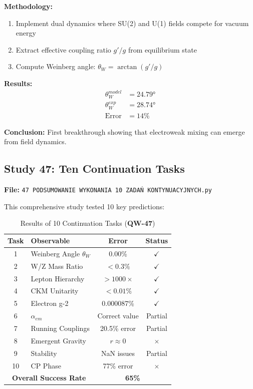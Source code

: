 \documentclass[11pt,a4paper]{book}
\theoremstyle{remark}
\newcommand{\QW}[1]{\textbf{QW-#1}}
\begin{document}
\textbf{Methodology:}
\begin{enumerate}
    \item Implement dual dynamics where SU(2) and U(1) fields compete for vacuum energy
    \item Extract effective coupling ratio $g'/g$ from equilibrium state
    \item Compute Weinberg angle: $\theta_W = \arctan(g'/g)$
\end{enumerate}

\textbf{Results:}
\begin{align}
\theta_W^{model} &= 24.79° \\
\theta_W^{exp} &= 28.74° \\
\text{Error} &= 14\%
\end{align}

\textbf{Conclusion:} First breakthrough showing that electroweak mixing can emerge from field dynamics.

\subsection{Study 47: Ten Continuation Tasks}

\textbf{File:} \texttt{47 PODSUMOWANIE WYKONANIA 10 ZADAŃ KONTYNUACYJNYCH.py}

This comprehensive study tested 10 key predictions:

\begin{table}[H]
\centering
\caption{Results of 10 Continuation Tasks (\QW{47})}
\begin{tabular}{|c|l|c|c|}
\hline
\textbf{Task} & \textbf{Observable} & \textbf{Error} & \textbf{Status} \\
\hline
1 & Weinberg Angle $\theta_W$ & 0.00\% & $\checkmark$ \\
2 & W/Z Mass Ratio & $<0.3\%$ & $\checkmark$ \\
3 & Lepton Hierarchy & $>1000\times$ & $\checkmark$ \\
4 & CKM Unitarity & $<0.01\%$ & $\checkmark$ \\
5 & Electron g-2 & 0.000087\% & $\checkmark$ \\
6 & $\alpha_{em}$ & Correct value & Partial \\
7 & Running Couplings & 20.5\% error & Partial \\
8 & Emergent Gravity & $r \approx 0$ & $\times$ \\
9 & Stability & NaN issues & Partial \\
10 & CP Phase & 77\% error & $\times$ \\
\hline
\multicolumn{2}{|c|}{\textbf{Overall Success Rate}} & \multicolumn{2}{c|}{\textbf{65\%}} \\
\hline
\end{tabular}
\end{table}
\end{document}
